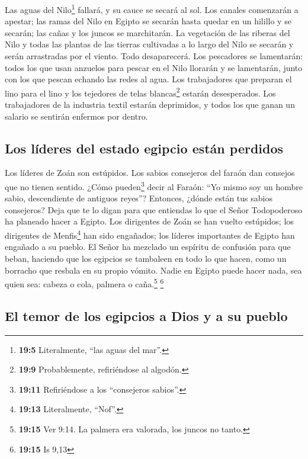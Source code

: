  Las aguas del Nilo\footnote{\textbf{19:5} Literalmente,
  ``las aguas del mar''.} fallará, y su cauce se secará al sol.
 Los canales comenzarán a apestar; las ramas del Nilo en
Egipto se secarán hasta quedar en un hilillo y se secarán; las cañas y
los juncos se marchitarán.  La vegetación de las riberas
del Nilo y todas las plantas de las tierras cultivadas a lo largo del
Nilo se secarán y serán arrastradas por el viento. Todo desaparecerá.
 Los pescadores se lamentarán: todos los que usan anzuelos
para pescar en el Nilo llorarán y se lamentarán, junto con los que
pescan echando las redes al agua.  Los trabajadores que
preparan el lino para el lino y los tejedores de telas
blancas\footnote{\textbf{19:9} Probablemente, refiriéndose al algodón.}
estarán desesperados.  Los trabajadores de la industria
textil estarán deprimidos, y todos los que ganan un salario se sentirán
enfermos por dentro.

\hypertarget{los-luxedderes-del-estado-egipcio-estuxe1n-perdidos}{%
\subsection{Los líderes del estado egipcio están
perdidos}\label{los-luxedderes-del-estado-egipcio-estuxe1n-perdidos}}

 Los líderes de Zoán son estúpidos. Los sabios consejeros
del faraón dan consejos que no tienen sentido. ¿Cómo pueden\footnote{\textbf{19:11}
  Refiriéndose a los ``consejeros sabios''.} decir al Faraón: ``Yo mismo
soy un hombre sabio, descendiente de antiguos reyes''? 
Entonces, ¿dónde están tus sabios consejeros? Deja que te lo digan para
que entiendas lo que el Señor Todopoderoso ha planeado hacer a Egipto.
 Los dirigentes de Zoán se han vuelto estúpidos; los
dirigentes de Menfis\footnote{\textbf{19:13} Literalmente, ``Nof''.} han
sido engañados; los líderes importantes de Egipto han engañado a su
pueblo.  El Señor ha mezclado un espíritu de confusión
para que beban, haciendo que los egipcios se tambaleen en todo lo que
hacen, como un borracho que resbala en su propio vómito. 
Nadie en Egipto puede hacer nada, sea quien sea: cabeza o cola, palmera
o caña.\footnote{\textbf{19:15} Ver 9:14. La palmera era valorada, los
  juncos no tanto.} \footnote{\textbf{19:15} Is 9,13}

\hypertarget{el-temor-de-los-egipcios-a-dios-y-a-su-pueblo}{%
\subsection{El temor de los egipcios a Dios y a su
pueblo}\label{el-temor-de-los-egipcios-a-dios-y-a-su-pueblo}}

